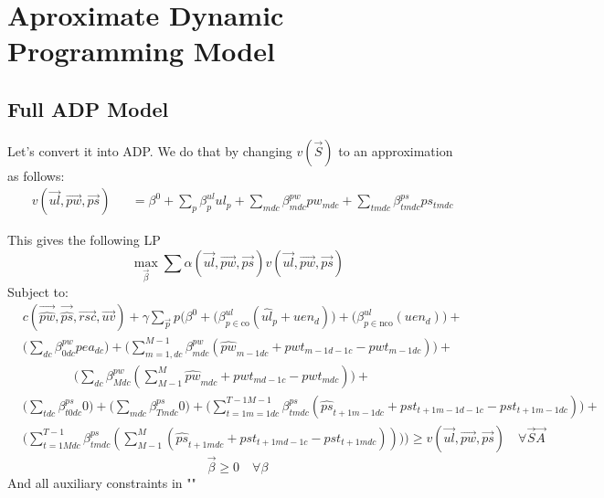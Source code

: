 \documentclass{article}
\begin{document}
\section{Aproximate Dynamic Programming Model}
\subsection{Full ADP Model}
Let's convert it into ADP. We do that by changing $v(\vec{S})$ to an approximation as follows:
\begin{equation}\begin{alignedat}{10}
	& v(\vec{ul}, \vec{pw}, \vec{ps}) 
		&& =  \beta^0 + \sum_{p} \beta_{p}^{ul} ul_{p} +
			\sum_{mdc} \beta_{mdc}^{pw} pw_{mdc}  + 
			\sum_{tmdc} \beta_{tmdc}^{ps} ps_{tmdc}
\end{alignedat} \end{equation}

This gives the following LP
\begin{equation}
	\max_{\vec{\beta}} \sum \alpha (\vec{ul}, \vec{pw}, \vec{ps}) v(\vec{ul}, \vec{pw}, \vec{ps})
\end{equation}
Subject to:
\begin{equation}\begin{alignedat}{10}
\label{full-adp-equation}
	& c(\vec{\hat{pw}}, \vec{\hat{ps}}, \vec{rsc}, \vec{uv}) + \gamma \sum_{\vec{p}} p \Bigg( 
		\beta^0 +
		\bigg( \beta^{ul}_{p \in \text{co}} (\hat{ul}_{p} + uen_{d}) \bigg) + 
		\bigg( \beta^{ul}_{p \in \text{nco}} (uen_{d}) \bigg) + \\  
	& 	\bigg( \sum_{dc} \beta_{0dc}^{pw} pea_{dc} \bigg) +
		\bigg( \sum_{m=1,dc}^{M-1} \beta_{mdc}^{pw} 
			(\hat{pw}_{m-1dc} + pwt_{m-1d-1c} - pwt_{m-1dc}) \bigg) + \\
	&	\qquad \qquad \bigg( \sum_{dc} \beta_{Mdc}^{pw} 
			(\sum_{M-1}^{M} \hat{pw}_{mdc} + pwt_{md-1c} - pwt_{mdc})\bigg) + \\
	& 	\bigg( \sum_{tdc} \beta_{t0dc}^{ps} 0 \bigg) +
		\bigg( \sum_{mdc} \beta_{Tmdc}^{ps} 0 \bigg) +
		\bigg( \sum_{t=1m=1dc}^{T-1M-1} \beta_{tmdc}^{ps} 
			(\hat{ps}_{t+1m-1dc} + pst_{t+1m-1d-1c} - pst_{t+1m-1dc}) \bigg) + \\	
	&	\bigg( \sum_{t=1Mdc}^{T-1} \beta_{tmdc}^{ps} 
			(\sum_{M-1}^{M} (\hat{ps}_{t+1mdc} + pst_{t+1md-1c} - pst_{t+1mdc})) \bigg)
	\Bigg) \ge v(\vec{ul}, \vec{pw}, \vec{ps}) \quad \forall \vec{S} \vec{A}
\end{alignedat} \end{equation}
\begin{equation}
	\vec{\beta} \ge 0 \quad \forall \beta
\end{equation}
And all auxiliary constraints in ""
\end{document}
